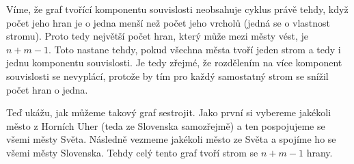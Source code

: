 \documentclass{fkssolpub}
\author{Ondřej Sedláček}
\begin{document}
Víme, že graf tvořící komponentu souvislosti neobsahuje cyklus právě tehdy, když počet jeho hran je o jedna menší než počet jeho vrcholů (jedná se o vlastnost stromu). Proto tedy největší počet hran, který může mezi městy vést, je $n + m - 1$. Toto nastane tehdy, pokud všechna města tvoří jeden strom a tedy i jednu komponentu souvislosti. Je tedy zřejmé, že rozdělením na více komponent souvislosti se nevyplácí, protože by tím pro každý samostatný strom se snížil počet hran o jedna.

Teď ukážu, jak můžeme takový graf sestrojit. Jako první si vybereme jakékoli město z Horních Uher (teda ze Slovenska samozřejmě) a ten pospojujeme se všemi městy Světa. Následně vezmeme jakékoli město ze Světa a spojíme ho se všemi městy Slovenska. Tehdy celý tento graf tvoří strom se $n + m - 1$ hrany.
\end{document}
